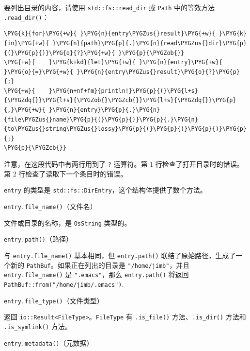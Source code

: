 要列出目录的内容，请使用 \texttt{std::fs::read\_dir} 或 \texttt{Path} 中的等效方法 \texttt{.read\_dir()}：

\begin{Verbatim}[commandchars=\\\{\},breaklines=true,breakanywhere=true,fontsize=\codefont,xleftmargin=17bp]
\PYG{k}{for}\PYG{+w}{ }\PYG{n}{entry\PYGZus{}result}\PYG{+w}{ }\PYG{k}{in}\PYG{+w}{ }\PYG{n}{path}\PYG{p}{.}\PYG{n}{read\PYGZus{}dir}\PYG{p}{(}\PYG{p}{)}\PYG{o}{?}\PYG{+w}{ }\PYG{p}{\PYGZob{}}
\PYG{+w}{    }\PYG{k+kd}{let}\PYG{+w}{ }\PYG{n}{entry}\PYG{+w}{ }\PYG{o}{=}\PYG{+w}{ }\PYG{n}{entry\PYGZus{}result}\PYG{o}{?}\PYG{p}{;}
\PYG{+w}{    }\PYG{n+nf+fm}{println!}\PYG{p}{(}\PYG{l+s}{\PYGZdq{}}\PYG{l+s}{\PYGZob{}\PYGZcb{}}\PYG{l+s}{\PYGZdq{}}\PYG{p}{,}\PYG{+w}{ }\PYG{n}{entry}\PYG{p}{.}\PYG{n}{file\PYGZus{}name}\PYG{p}{(}\PYG{p}{)}\PYG{p}{.}\PYG{n}{to\PYGZus{}string\PYGZus{}lossy}\PYG{p}{(}\PYG{p}{)}\PYG{p}{)}\PYG{p}{;}
\PYG{p}{\PYGZcb{}}
\end{Verbatim}

注意，在这段代码中有两行用到了 \texttt{?} 运算符。第 1 行检查了打开目录时的错误。第 2 行检查了读取下一个条目时的错误。

\texttt{entry} 的类型是 \texttt{std::fs::DirEntry}，这个结构体提供了数个方法。

\begin{mySidenote}
\texttt{entry.file\_name()}（文件名）
\end{mySidenote}

文件或目录的名称，是 \texttt{OsString} 类型的。

\begin{mySidenote}
\texttt{entry.path()}（路径）
\end{mySidenote}

与 \texttt{entry.file\_name()} 基本相同，但 \texttt{entry.path()} 联结了原始路径，生成了一个新的 \texttt{PathBuf}。如果正在列出的目录是 \texttt{"/home/\allowbreak{}jimb"}，并且 \texttt{entry.file\_name()} 是 \texttt{".emacs"}，那么 \texttt{entry.path()} 将返回 \texttt{PathBuf::from("/home/\allowbreak{}jimb/\allowbreak{}.emacs")}.

\begin{mySidenote}
\texttt{entry.file\_type()}（文件类型）
\end{mySidenote}

返回 \texttt{io::Result<FileType>}。\texttt{FileType} 有 \texttt{.is\_file()} 方法、\texttt{.is\_dir()} 方法和 \texttt{.is\_symlink()} 方法。

\begin{mySidenote}
\texttt{entry.metadata()}（元数据）
\end{mySidenote}

